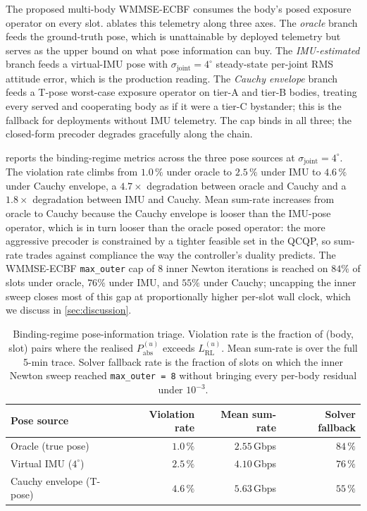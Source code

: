 \documentclass[journal,twocolumn,10pt]{IEEEtran}
\theoremstyle{plain}
\theoremstyle{remark}
\newcommand{\Pabs}{P_{\mathrm{abs}}}
\begin{document}
The proposed multi-body WMMSE-ECBF consumes the body's posed
exposure operator on every slot.  ablates this
telemetry along three axes. The \emph{oracle} branch feeds the
ground-truth pose, which is unattainable by deployed telemetry but
serves as the upper bound on what pose information can buy. The
\emph{IMU-estimated} branch feeds a virtual-IMU pose with
$\sigma_{\mathrm{joint}} = 4^\circ$ steady-state per-joint RMS
attitude error, which is the production reading. The \emph{Cauchy
envelope} branch feeds a T-pose worst-case exposure operator on
tier-A and tier-B bodies, treating every served and cooperating body
as if it were a tier-C bystander; this is the fallback for
deployments without IMU telemetry. The cap binds in all three;
the closed-form precoder degrades gracefully along the chain.

 reports the binding-regime metrics across the
three pose sources at $\sigma_{\mathrm{joint}} = 4^\circ$. The
violation rate climbs from $1.0\,\%$ under oracle to $2.5\,\%$ under
IMU to $4.6\,\%$ under Cauchy envelope, a $4.7\times$ degradation
between oracle and Cauchy and a $1.8\times$ degradation between IMU
and Cauchy. Mean sum-rate increases from oracle to Cauchy because
the Cauchy envelope is looser than the IMU-pose operator, which is
in turn looser than the oracle posed operator: the more aggressive
precoder is constrained by a tighter feasible set in the QCQP, so
sum-rate trades against compliance the way the controller's
duality predicts. The WMMSE-ECBF \texttt{max\_outer} cap of $8$
inner Newton iterations is reached on $84\%$ of slots under oracle,
$76\%$ under IMU, and $55\%$ under Cauchy; uncapping the inner sweep
closes most of this gap at proportionally higher per-slot wall clock,
which we discuss in \cref{sec:discussion}.

\begin{table}[!t]
\caption{Binding-regime pose-information triage. Violation rate is
the fraction of (body, slot) pairs where the realised
$\Pabs^{(u)}$ exceeds $L^{(u)}_{\mathrm{RL}}$. Mean sum-rate is over
the full 5-min trace. Solver fallback rate is the fraction of slots
on which the inner Newton sweep reached \texttt{max\_outer = 8}
without bringing every per-body residual under $10^{-3}$.}
\label{tab:pose-triage}
\centering
\small
\begin{tabular}{@{}lrrr@{}}
\toprule
Pose source & Violation rate & Mean sum-rate & Solver fallback \\
\midrule
Oracle (true pose) & $1.0\,\%$ & $2.55\,$Gbps & $84\,\%$ \\
Virtual IMU ($4^\circ$) & $2.5\,\%$ & $4.10\,$Gbps & $76\,\%$ \\
Cauchy envelope (T-pose) & $4.6\,\%$ & $5.63\,$Gbps & $55\,\%$ \\
\bottomrule
\end{tabular}
\end{table}
\end{document}
